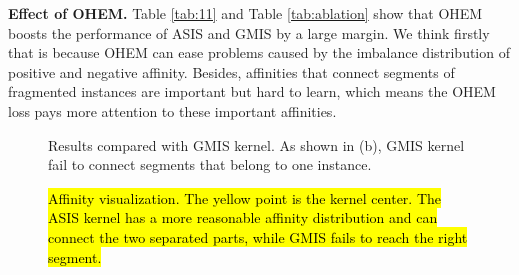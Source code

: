 \textbf{Effect of OHEM.} Table \ref{tab:11} and Table \ref{tab:ablation} show that OHEM boosts the performance of ASIS and GMIS by a large margin. We think firstly that is because OHEM can ease problems caused by the imbalance distribution of positive and negative affinity. Besides, affinities that connect segments of fragmented instances are important but hard to learn, which means the OHEM loss pays more attention to these important affinities. 

\begin{figure}
\centering
    {\begin{minipage}[t]{0.45\linewidth}
    \caption{Results compared with GMIS kernel. As shown in (b), GMIS kernel fail to connect segments that belong to one instance.}
    \label{fig:badcase}
    \end{minipage}}
    \hspace{5mm}
    {\begin{minipage}[t]{0.45\linewidth}
    \caption{\hl{Affinity visualization. The yellow point is the kernel center. The ASIS kernel has a more reasonable affinity distribution and can connect the two separated parts, while GMIS fails to reach the right segment.}}
    \label{fig:aff_vis}
    \end{minipage}}
\end{figure}